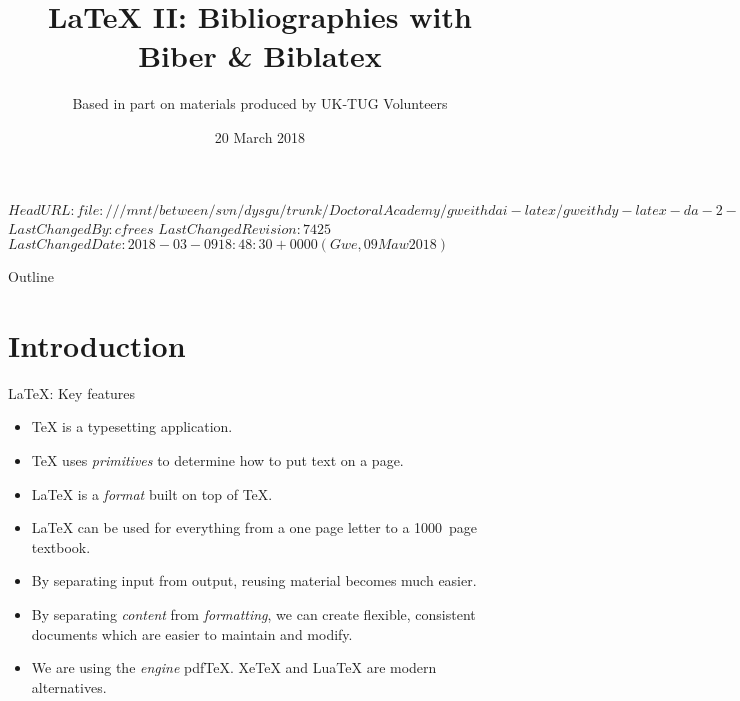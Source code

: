 \svnidlong
{$HeadURL: file:///mnt/between/svn/dysgu/trunk/DoctoralAcademy/gweithdai-latex/gweithdy-latex-da-2-biblatex/training.tex $}
{$LastChangedBy: cfrees $}
{$LastChangedRevision: 7425 $}
{$LastChangedDate: 2018-03-09 18:48:30 +0000 (Gwe, 09 Maw 2018) $}



\title{\LaTeX{} II: Bibliographies with Biber \& Biblatex}
\subtitle{Based in part on materials produced by UK-TUG Volunteers}
\date{ 20 March 2018}




\begin{frame}
  \titlepage
\end{frame}

\maketitle


\tableofcontents

%
{
  \begin{frame}{Outline}
    \tableofcontents
  \end{frame}
}

%

\section{Introduction}

\begin{frame}{\LaTeX{}: Key features}

  \begin{itemize}
    \item \TeX{} is a typesetting application.
    \item \TeX{} uses \emph{primitives} to determine how to put text on a page.
    \item \LaTeX{} is  a \emph{format} built on top of \TeX{}.
    \item \LaTeX{} can be used for everything from a one page letter to a 1000~page textbook.
    \item By separating input from output, reusing material becomes much easier.
    \item By separating \emph{content} from \emph{formatting}, we can create flexible, consistent documents which are easier to maintain and modify.
    \item We are using the \emph{engine} pdf\TeX{}.
    Xe\TeX{} and Lua\TeX{} are modern alternatives.
  \end{itemize}

\end{frame}

